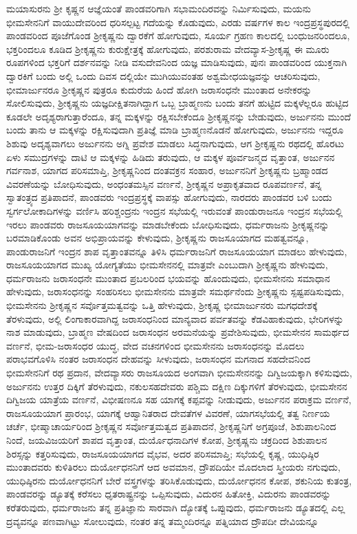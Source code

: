 ಮಯಾಸುರನು ಶ‍್ರೀ ಕೃಷ್ಣನ ಆಜ್ಞೆಯಂತೆ ಪಾಂಡವರಿಗಾಗಿ ಸಭಾಮಂದಿರವನ್ನು ನಿರ್ಮಿಸುವುದು, ಮಯನು ಭೀಮಸೇನನಿಗೆ ವಾಯುದೇವರಿಂದ ಧರಿಸಲ್ಪಟ್ಟ ಗದೆಯನ್ನು ಕೊಡುವುದು, ಎರಡು ವರ್ಷಗಳ ಕಾಲ ಇಂದ್ರಪ್ರಸ್ಥಪುರದಲ್ಲಿ ಪಾಂಡವರಿಂದ ಪೂಜೆಗೊಂಡ ಶ‍್ರೀಕೃಷ್ಣನು ದ್ವಾರಕೆಗೆ ಹೋಗುವುದು, ಸೂರ್ಯ ಗ್ರಹಣ ಕಾಲದಲ್ಲಿ ಬಂಧುಜನರಿಂದಲೂ, ಭಕ್ತರಿಂದಲೂ ಕೂಡಿದ ಶ‍್ರೀಕೃಷ್ಣನು ಕುರುಕ್ಷೇತ್ರಕ್ಕೆ ಹೋಗುವುದು, ಪರಶುರಾಮ ವೇದವ್ಯಾಸ-ಶ‍್ರೀಕೃಷ್ಣ ಈ ಮೂರು ರೂಪಗಳಿಂದ ಭಕ್ತರಿಗೆ ದರ್ಶನವನ್ನು ನೀಡಿ ವಸುದೇವನಿಂದ ಯಜ್ಞ ಮಾಡಿಸುವುದು, ಪುನಃ ಪಾಂಡವರಿಂದ ಯುಕ್ತನಾಗಿ ದ್ವಾರಕಿಗೆ ಬಂದು ಅಲ್ಲಿ ಒಂದು ದಿವಸ ದಲ್ಲಿಯೇ ಮುಗಿಯುವಂತಹ ಅಶ್ವಮೇಧಯಜ್ಞವನ್ನು ಆಚರಿಸುವುದು, ಭೀಮಾರ್ಜುನರೂ ಶ‍್ರೀಕೃಷ್ಣನ ಪುತ್ರರೂ ಕುದುರೆಯ ಹಿಂದೆ ಹೋಗಿ ಜರಾಸಂಧನೇ ಮುಂತಾದ ಅನೇಕರನ್ನು ಸೋಲಿಸುವುದು, ಶ‍್ರೀಕೃಷ್ಣನು ಯಜ್ಞದೀಕ್ಷಿತನಾಗಿದ್ದಾಗ ಒಬ್ಬ ಬ್ರಾಹ್ಮಣನು ಬಂದು ತನಗೆ ಹುಟ್ಟಿದ ಮಕ್ಕಳೆಲ್ಲರೂ ಹುಟ್ಟಿದ ಕೂಡಲೇ ಅದೃಶ್ಯರಾಗುತ್ತಾರೆಂದೂ, ತನ್ನ ಮಕ್ಕಳನ್ನು ರಕ್ಷಿಸಬೇಕೆಂದೂ ಶ‍್ರೀಕೃಷ್ಣನನ್ನು ಬೇಡುವುದು, ಅರ್ಜುನನು ಮುಂದೆ ಬಂದು ತಾನು ಆ ಮಕ್ಕಳನ್ನು ರಕ್ಷಿಸುವುದಾಗಿ ಪ್ರತಿಜ್ಞೆ ಮಾಡಿ ಬ್ರಾಹ್ಮಣನೊಡನೆ ಹೋಗುವುದು, ಅರ್ಜುನನು ಇದ್ದರೂ ಶಿಶುವು ಅದೃಶ್ಯವಾಗಲು ಅರ್ಜುನನು ಅಗ್ನಿ ಪ್ರವೇಶ ಮಾಡಲು ಸಿದ್ಧನಾಗುವುದು, ಆಗ ಶ‍್ರೀಕೃಷ್ಣನು ರಥದಲ್ಲಿ ಹೊರಟು ಏಳು ಸಮುದ್ರಗಳನ್ನು ದಾಟಿ ಆ ಮಕ್ಕಳನ್ನು ಹಿಡಿದು ತರುವುದು, ಆ ಮಕ್ಕಳ ಪೂರ್ವಜನ್ಮದ ವೃತ್ತಾಂತ, ಅರ್ಜುನನ ಗರ್ವನಾಶ, ಯಾಗದ ಪರಿಸಮಾಪ್ತಿ, ಶ‍್ರೀಕೃಷ್ಣನಿಂದ ದಂತವಕ್ರನ ಸಂಹಾರ, ಅರ್ಜುನನಿಗೆ ಶ‍್ರೀಕೃಷ್ಣನು ಬ್ರಹ್ಮಾಂಡದ ವಿವರಣೆಯನ್ನು ಬೋಧಿಸುವುದು, ಅಂಧಂತಮಸ್ಸಿನ ವರ್ಣನೆ, ಶ‍್ರೀಕೃಷ್ಣನ ಅಪ್ರಾಕೃತವಾದ ರೂಪವರ್ಣನೆ, ತನ್ನ ಸ್ವಾತಂತ್ರ್ಯದ ಪ್ರತಿಪಾದನೆ, ಪಾಂಡವರು ಇಂದ್ರಪ್ರಸ್ಥಕ್ಕೆ ವಾಪಸ್ಸು ಹೋಗುವುದು, ನಾರದರು ಪಾಂಡವರ ಬಳಿ ಬಂದು ಸ್ವರ್ಗಲೋಕಾದಿಗಳನ್ನು ವರ್ಣಿಸಿ ಹರಿಶ್ಚಂದ್ರನು ಇಂದ್ರನ ಸಭೆಯಲ್ಲಿ ಇರುವಂತೆ ಪಾಂಡುರಾಜನೂ ಇಂದ್ರನ ಸಭೆಯಲ್ಲಿ ಇರಲು ಪಾಂಡವರು ರಾಜಸೂಯಯಾಗವನ್ನು ಮಾಡಬೇಕೆಂದು ಬೋಧಿಸುವುದು, ಧರ್ಮರಾಜನು ಶ‍್ರೀಕೃಷ್ಣನನ್ನು ಬರಮಾಡಿಕೊಂಡು ಅವನ ಅಭಿಪ್ರಾಯವನ್ನು ಕೇಳುವುದು, ಶ‍್ರೀಕೃಷ್ಣನು ರಾಜಸೂಯಾಗದ ಮಹತ್ವವನ್ನೂ, ಪಾಂಡುರಾಜನಿಗೆ ಇಂದ್ರನ ಶಾಪ ವೃತ್ತಾಂತವನ್ನೂ ತಿಳಿಸಿ ಧರ್ಮರಾಜನಿಗೆ ರಾಜಸೂಯಯಾಗ ಮಾಡಲು ಹೇಳುವುದು, ರಾಜಸೂಯಯಾಗದ ಮುಖ್ಯ ಯೋಗ್ಯತೆಯು ಭೀಮಸೇನನಲ್ಲಿ ಮಾತ್ರವೇ ಎಂಬುದಾಗಿ ಶ‍್ರೀಕೃಷ್ಣನು ಹೇಳುವುದು, ಧರ್ಮರಾಜನು ಜರಾಸಂಧನೇ ಮುಂತಾದ ಪ್ರಬಲರಿಂದ ಭಯವನ್ನು ಹೊಂದುವುದು, ಭೀಮಸೇನನು ಸಮಾಧಾನ ಹೇಳುವುದು, ಜರಾಸಂಧನನ್ನು ಸಂಹರಿಸಲು ಭೀಮಸೇನನು ಮಾತ್ರವೇ ಸಮರ್ಥನೆಂದು ಶ‍್ರೀಕೃಷ್ಣನು ಸ್ಪಷ್ಟಪಡಿಸುವುದು, ಭೀಮಸೇನನು ಶ‍್ರೀಕೃಷ್ಣನ ಸರ್ವೊತ್ತಮತ್ವವನ್ನು ಒತ್ತಿ ಹೇಳುವುದು, ಶ‍್ರೀಕೃಷ್ಣ ಭೀಮಾರ್ಜುನರು ಮಗಧದೇಶಕ್ಕೆ ತೆರಳುವುದು, ಅಲ್ಲಿ ಲಿಂಗಾಕಾರವಾಗಿದ್ದ ಜರಾಸಂಧನಿಂದ ಮಾನ್ಯವಾದ ಪರ್ವತವನ್ನು ಕೆಡವಿಹಾಕುವುದು, ಭೇರಿಗಳನ್ನು ನಾಶ ಮಾಡುವುದು, ಬ್ರಾಹ್ಮಣ ವೇಷದಿಂದ ಜರಾಸಂಧನ ಅರಮನೆಯನ್ನು ಪ್ರವೇಶಿಸುವುದು, ಭೀಮಸೇನನ ಸಾಮರ್ಥದ ವರ್ಣನೆ, ಭೀಮ-ಜರಾಸಂಧರ ಯುದ್ಧ, ವೇದ ವಚನಗಳಿಂದ ಭೀಮಸೇನನು ಜರಾಸಂಧನನ್ನು ಮೊದಲು ಪರಾಭವಗೊಳಿಸಿ ನಂತರ ಜರಾಸಂಧನ ದೇಹವನ್ನು ಸೀಳುವುದು, ಜರಾಸಂಧನ ಮಗನಾದ ಸಹದೇವನಿಂದ ಭೀಮಸೇನನಿಗೆ ರಥ ಪ್ರದಾನ, ವೇದವ್ಯಾಸರು ರಾಜಸೂಯದ ಅಂಗವಾಗಿ ಭೀಮಸೇನನನ್ನು ದಿಗ್ವಿಜಯಕ್ಕಾಗಿ ಕಳಿಸುವುದು, ಅರ್ಜುನನು ಉತ್ತರ ದಿಕ್ಕಿಗೆ ತೆರಳುವುದು, ನಕುಲಸಹದೇವರು ಪಶ್ಚಿಮ ದಕ್ಷಿಣ ದಿಕ್ಕುಗಳಿಗೆ ತೆರಳುವುದು, ಭೀಮಸೇನನ ದಿಗ್ವಿಜಯ ಯಾತ್ರೆಯ ವರ್ಣನೆ, ವಿಭೀಷಣನೂ ಸಹ ಯಾಗಕ್ಕೆ ಕಪ್ಪವನ್ನು ನೀಡುವುದು, ಅರ್ಜುನನ ಪರಾಕ್ರಮ ವರ್ಣನೆ, ರಾಜಸೂಯಯಾಗ ಪ್ರಾರಂಭ, ಯಾಗಕ್ಕೆ ಆಹ್ವಾನಿತರಾದ ದೇವತೆಗಳ ವಿವರಣೆ, ಯಾಗಸಭೆಯಲ್ಲಿ ತತ್ವ ನಿರ್ಣಯ ಚರ್ಚೆ, ಭೀಷ್ಮಾಚಾರ್ಯರಿಂದ ಶ‍್ರೀಕೃಷ್ಣನ ಸರ್ವೋತ್ತಮತ್ವದ ಪ್ರತಿಪಾದನೆ, ಶ‍್ರೀಕೃಷ್ಣನಿಗೆ ಅಗ್ರಪೂಜೆ, ಶಿಶುಪಾಲನಿಂದ ನಿಂದೆ, ಜಯವಿಜಯರಿಗೆ ಶಾಪದ ವೃತ್ತಾಂತ, ದುರ್ಯೊಧನಾದಿಗಳ ಕೋಪ, ಶ‍್ರೀಕೃಷ್ಣನು ಚಕ್ರದಿಂದ ಶಿಶುಪಾಲನ ಶಿರಸ್ಸನ್ನು ಕತ್ತರಿಸುವುದು, ರಾಜಸೂಯಯಾಗದ ವೈಭವ, ಅದರ ಪರಿಸಮಾಪ್ತಿ; ಸಭೆಯಲ್ಲಿ ಕೃಷ್ಣ, ಯುಧಿಷ್ಠಿರ ಮುಂತಾದವರು ಕುಳಿತಿರಲು ದುರ್ಯೋಧನನಿಗೆ ಆದ ಅವಮಾನ, ದ್ರೌಪದಿಯೇ ಮೊದಲಾದ ಸ್ತ್ರೀಯರು ನಗುವುದು, ಯುಧಿಷ್ಠಿರನು ದುರ್ಯೋಧನನಿಗೆ ಬೇರೆ ವಸ್ತ್ರಗಳನ್ನು ತರಿಸಿಕೊಡುವುದು, ದುರ್ಯೋಧನನ ಕೋಪ, ಶಕುನಿಯ ಕುತಂತ್ರ, ಪಾಂಡವರನ್ನು ಡ್ಯೂತಕ್ಕೆ ಕರೆಸಲು ಧೃತರಾಷ್ಟ್ರನನ್ನು ಒಪ್ಪಿಸುವುದು, ವಿದುರನ ಹಿತೋಕ್ತಿ, ವಿದುರನು ಪಾಂಡವರನ್ನು ಕರೆತರುವುದು, ಧರ್ಮರಾಜನು ತನ್ನ ಪ್ರತಿಜ್ಞಾನು ಸಾರವಾಗಿ ದ್ಯೋತಕ್ಕೆ ಒಪ್ಪುವುದು, ಧರ್ಮರಾಜನು ಡ್ಯೂತದಲ್ಲಿ ಎಲ್ಲ ದ್ರವ್ಯವನ್ನೂ ಪಣವಾಗಿಟ್ಟು ಸೋಲುವುದು, ನಂತರ ತನ್ನ ತಮ್ಮಂದಿರನ್ನೂ ಪತ್ನಿಯಾದ ದ್ರೌಪದೀ ದೇವಿಯನ್ನೂ 